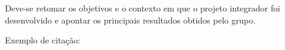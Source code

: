 Deve-se retomar os objetivos e o contexto em que o projeto integrador foi
desenvolvido e apontar os principais resultados obtidos pelo grupo.

Exemplo de citação:
\cite{historia_da_matematica}